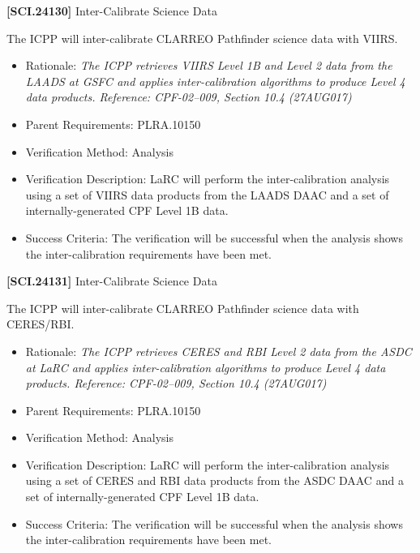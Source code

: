\textbf{[SCI.24130]} Inter-Calibrate Science Data

The \gls{ICPP} will inter-calibrate \gls{CLARREO} Pathfinder science data with \gls{VIIRS}.

\begin{itemize}
\item{} Rationale: \emph{The ICPP retrieves VIIRS Level 1B and Level 2 data from the LAADS at GSFC and applies inter-calibration algorithms to produce Level 4 data products. Reference: CPF-02--009, Section 10.4 (27AUG017)}

\item{} Parent Requirements: PLRA.10150

\item{} Verification Method: Analysis

\item{} Verification Description: \gls{LaRC} will perform the inter-calibration \gls{analysis} using a set of \gls{VIIRS} data products from the \gls{LAADS} \gls{DAAC} and a set of internally-generated \gls{CPF} Level 1B data.

\item{} Success Criteria: The verification will be successful when the \gls{analysis} shows the inter-calibration requirements have been met.

\end{itemize}

\textbf{[SCI.24131]} Inter-Calibrate Science Data

The \gls{ICPP} will inter-calibrate \gls{CLARREO} Pathfinder science data with \gls{CERES}\slash \gls{RBI}.

\begin{itemize}
\item{} Rationale: \emph{The ICPP retrieves CERES and RBI Level 2 data from the ASDC at LaRC and applies inter-calibration algorithms to produce Level 4 data products. Reference: CPF-02--009, Section 10.4 (27AUG017)}

\item{} Parent Requirements: PLRA.10150

\item{} Verification Method: Analysis

\item{} Verification Description: \gls{LaRC} will perform the inter-calibration \gls{analysis} using a set of \gls{CERES} and \gls{RBI} data products from the \gls{ASDC} \gls{DAAC} and a set of internally-generated \gls{CPF} Level 1B data.

\item{} Success Criteria: The verification will be successful when the \gls{analysis} shows the inter-calibration requirements have been met.

\end{itemize}


